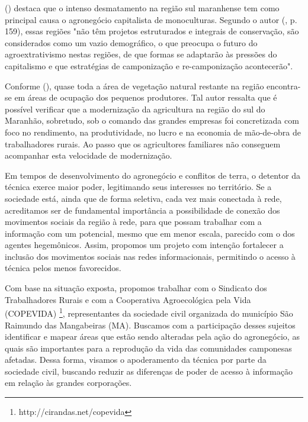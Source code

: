  (\citeyear{meiners2013}) destaca que o intenso desmatamento na região sul maranhense tem como principal causa o agronegócio capitalista de monoculturas. Segundo o autor (\citeyear{meiners2013}, p. 159), essas regiões "não têm projetos estruturados e integrais de conservação, são considerados como um vazio demográfico, o que preocupa o futuro do agroextrativismo nestas regiões, de que formas se adaptarão às pressões do capitalismo e que estratégias de camponização e re-camponização acontecerão".

Conforme  (\citeyear{studte2008}), quase toda a área de vegetação natural restante na região encontra-se em áreas de ocupação dos pequenos produtores. Tal autor ressalta que é possível verificar que a modernização  da  agricultura na região do sul do Maranhão, sobretudo, sob o comando das grandes empresas foi concretizada  com foco no rendimento, na produtividade, no lucro e na economia de mão-de-obra de trabalhadores rurais. Ao passo que os agricultores familiares não conseguem acompanhar esta velocidade de modernização.

Em tempos de desenvolvimento do agronegócio e conflitos de terra, o detentor da técnica exerce maior poder, legitimando seus interesses no território. Se a sociedade está, ainda que de forma seletiva, cada vez mais conectada à rede, acreditamos ser de fundamental importância a possibilidade de conexão dos movimentos sociais da região à rede, para que possam trabalhar com a informação com um potencial, mesmo que em menor escala, parecido com o dos agentes hegemônicos. Assim, propomos um projeto com intenção fortalecer a inclusão dos movimentos sociais nas redes informacionais, permitindo o acesso à técnica pelos menos favorecidos. 

Com base na situação exposta, propomos trabalhar com o Sindicato dos Trabalhadores Rurais e com a Cooperativa Agroecológica pela Vida (COPEVIDA) \footnote{http://cirandas.net/copevida}, representantes da sociedade civil organizada do município São Raimundo das Mangabeiras (MA). Buscamos com a participação desses sujeitos identificar e mapear áreas que estão sendo alteradas pela ação do agronegócio, as quais são importantes para a reprodução da vida das comunidades camponesas afetadas. Dessa forma, visamos o apoderamento da técnica por parte da sociedade civil, buscando reduzir as diferenças de poder de acesso à informação em relação às grandes corporações.

